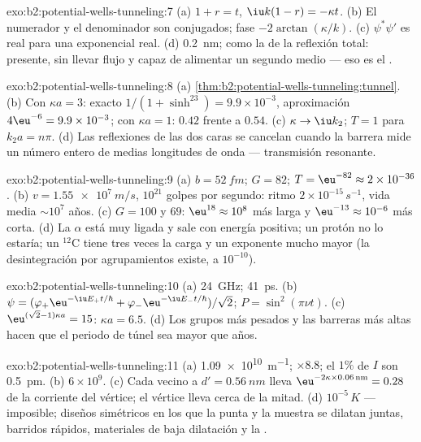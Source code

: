 \begin{solution}{exo:b2:potential-wells-tunneling:7}
(a) $1 + r = t$, $\iu k(1 - r) = -\kappa t$. (b) El numerador y el denominador
son conjugados; fase $-2\arctan(\kappa/k)$. (c) $\psi^*\psi'$ es real para una
exponencial real. (d) \qty{0.2}{nm}; como la  de la reflexión
total: presente, sin llevar flujo y capaz de alimentar un segundo medio
--- eso es el .
\end{solution}

\begin{solution}{exo:b2:potential-wells-tunneling:8}
(a) \cref{thm:b2:potential-wells-tunneling:tunnel}. (b) Con $\kappa a = 3$:
exacto $1/(1 + \sinh^23) = 9.9 \times 10^{-3}$, aproximación $4\eu^{-6} = 9.9 \times
10^{-3}$; con $\kappa a = 1$: $0.42$ frente a $0.54$. (c) $\kappa \to \iu k_2$; $T = 1$
para $k_2a = n\pi$. (d) Las reflexiones de las dos caras se cancelan cuando la
barrera mide un número entero de medias longitudes de onda --- transmisión
resonante.
\end{solution}

\begin{solution}{exo:b2:potential-wells-tunneling:9}
(a) $b = \qty{52}{fm}$; $G = 82$; $T = \eu^{-82} \approx 2 \times 10^{-36}$. (b) $v =
\qty{1.55e7}{m/s}$, $10^{21}$ golpes por segundo: ritmo $2 \times 10^{-15}\,\unit{s^{-1}}$,
vida media $\sim 10^7$ años. (c) $G = 100$ y $69$: $\eu^{18} \approx 10^8$ más larga y
$\eu^{-13} \approx 10^{-6}$ más corta. (d) La $\alpha$ está muy ligada y sale
con energía positiva; un protón no lo estaría; un $^{12}$C tiene tres veces la
carga y un exponente mucho mayor (la desintegración por agrupamientos existe, a $10^{-10}$).
\end{solution}

\begin{solution}{exo:b2:potential-wells-tunneling:10}
(a) \qty{24}{GHz}; \qty{41}{ps}. (b) $\psi = (\varphi_+\eu^{-\iu E_+t/\hbar} +
\varphi_-\eu^{-\iu E_-t/\hbar})/\sqrt2$; $P = \sin^2(\pi\nu t)$. (c) $\eu^{(\sqrt2 - 1)
\kappa a} = 15$: $\kappa a = 6.5$. (d) Los grupos más pesados y las barreras más altas hacen
que el periodo de túnel sea mayor que años.
\end{solution}

\begin{solution}{exo:b2:potential-wells-tunneling:11}
(a) \qty{1.09e10}{m^{-1}}; $\times 8.8$; el $1\%$ de $I$ son \qty{0.5}{pm}. (b) $6 \times 10^9$.
(c) Cada vecino a $d' = \qty{0.56}{nm}$ lleva $\eu^{-2\kappa \times 0.06\,\text{nm}}
= 0.28$ de la corriente del vértice; el vértice lleva cerca de la mitad. (d)
$10^{-5}\,\unit{K}$ --- imposible; diseños simétricos en los que la punta y la muestra
se dilatan juntas, barridos rápidos, materiales de baja dilatación y la .
\end{solution}

